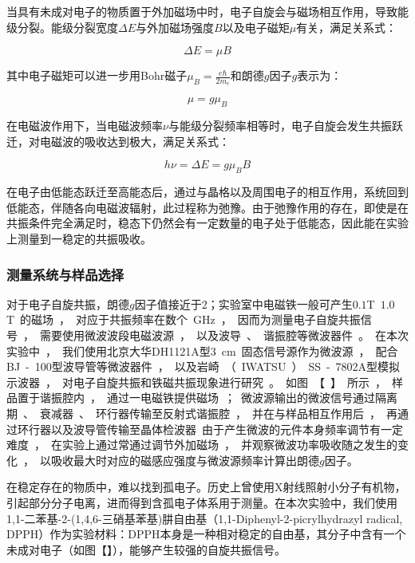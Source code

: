 \documentclass{thuemp}
\begin{document}
当具有未成对电子的物质置于外加磁场中时，电子自旋会与磁场相互作用，导致能级分裂。能级分裂宽度$\Delta E$与外加磁场强度$B$以及电子磁矩$\mu$有关，满足关系式：

\begin{equation}
\Delta E = \mu B
\end{equation}

其中电子磁矩可以进一步用Bohr磁子$\mu_B = \frac{e\hbar}{2m_e}$和朗德$g$因子$g$表示为：

\begin{equation}
\mu = g \mu_B
\end{equation}

在电磁波作用下，当电磁波频率$\nu$与能级分裂频率相等时，电子自旋会发生共振跃迁，对电磁波的吸收达到极大，满足关系式：

\begin{equation}
h \nu  = \Delta E = g \mu_B B
\end{equation}

在电子由低能态跃迁至高能态后，通过与晶格以及周围电子的相互作用，系统回到低能态，伴随各向电磁波辐射，此过程称为弛豫。由于弛豫作用的存在，即使是在共振条件完全满足时，稳态下仍然会有一定数量的电子处于低能态，因此能在实验上测量到一稳定的共振吸收。

\subsubsection{测量系统与样品选择}

对于电子自旋共振，朗德$g$因子值接近于2；实验室中电磁铁一般可产生$0.1$\si{\tesla}~$1.0$\si\tesla 的磁场，对应于共振频率在数个\si{\giga\hertz}，因而为测量电子自旋共振信号，需要使用微波波段电磁波源，以及波导、谐振腔等微波器件。

在本次实验中，我们使用北京大华DH1121A型3\si{\centi\meter}固态信号源作为微波源，配合BJ-100型波导管等微波器件，以及岩崎（IWATSU）SS-7802A型模拟示波器，对电子自旋共振和铁磁共振现象进行研究。如图【】所示，样品置于谐振腔内，通过一电磁铁提供磁场；微波源输出的微波信号通过隔离期、衰减器、环行器传输至反射式谐振腔，并在与样品相互作用后，再通过环行器以及波导管传输至晶体检波器

由于产生微波的元件本身频率调节有一定难度，在实验上通过常通过调节外加磁场，并观察微波功率吸收随之发生的变化，以吸收最大时对应的磁感应强度与微波源频率计算出朗德$g$因子。

在稳定存在的物质中，难以找到孤电子。历史上曾使用X射线照射小分子有机物，引起部分分子电离，进而得到含孤电子体系用于测量。在本次实验中，我们使用1,1-二苯基-2-(1,4,6-三硝基苯基)肼自由基（1,1-Diphenyl-2-picrylhydrazyl radical, DPPH）作为实验材料：DPPH本身是一种相对稳定的自由基，其分子中含有一个未成对电子（如图【】），能够产生较强的自旋共振信号。
\end{document}
